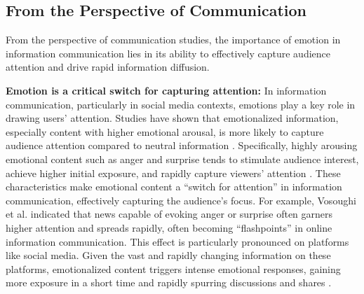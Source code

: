 \subsection{From the Perspective of Communication}%
From the perspective of communication studies, the importance of emotion in information communication lies in its ability to effectively capture audience attention and drive rapid information diffusion.

\textbf{Emotion is a critical switch for capturing attention:} In information communication, particularly in social media contexts, emotions play a key role in drawing users’ attention. Studies have shown that emotionalized information, especially content with higher emotional arousal, is more likely to capture audience attention compared to neutral information \cite{egidi2012emotional, tyng2017influences}. Specifically, highly arousing emotional content such as anger and surprise tends to stimulate audience interest, achieve higher initial exposure, and rapidly capture viewers’ attention \cite{lopez2021translating, vosoughi2018spread}. These characteristics make emotional content a “switch for attention” in information communication, effectively capturing the audience’s focus. For example, Vosoughi et al. \cite{vosoughi2018spread} indicated that news capable of evoking anger or surprise often garners higher attention and spreads rapidly, often becoming “flashpoints” in online information communication. This effect is particularly pronounced on platforms like social media. Given the vast and rapidly changing information on these platforms, emotionalized content triggers intense emotional responses, gaining more exposure in a short time and rapidly spurring discussions and shares \cite{schreiner2021impact}.

